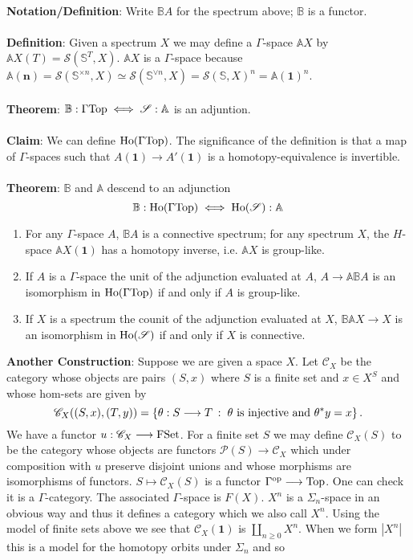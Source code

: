 \documentclass[11pt]{article}
\begin{document}
\begin{Jandr GammaCat notes}
\\
\textbf{Notation/Definition}: Write $\mathbb{B}A$ for the spectrum above; $\mathbb{B}$ is a functor.\\
\\
\textbf{Definition}: Given a spectrum $X$ we may define a $\Gamma$-space $\mathbb{A}X$ by $\mathbb{A}X(T)=\mathscr{S}(\mathbb{S}^T,X)$. $\mathbb{A}X$ is a $\Gamma$-space because $\mathbb{A}(\textbf{n})=\mathscr{S}(\mathbb{S}^{\times n},X)\simeq\mathscr{S}(\mathbb{S}^{\vee n},X)=\mathscr{S}(\mathbb{S},X)^n=\mathbb{A}(\textbf{1})^n$.\\
\\
\textbf{Theorem}: $\mathbb{B}:\Gamma\textup{Top}\iff\mathscr{S}:\mathbb{A}$ is an adjuntion.\\
\\
\textbf{Claim}: We can define $\textup{Ho}(\Gamma\textup{Top})$. The significance of the definition is that a map of $\Gamma$-spaces such that $A(\textbf{1})\to A'(\textbf{1})$ is a homotopy-equivalence is invertible.
\\
\\
\textbf{Theorem}: $\mathbb{B}$ and $\mathbb{A}$ descend to an adjunction
\[\mathbb{B}:\textup{Ho}(\Gamma\textup{Top})\iff\textup{Ho}(\mathscr{S}):\mathbb{A}\]
\begin{enumerate}
\item For any $\Gamma$-space $A$, $\mathbb{B}A$ is a connective spectrum; for any spectrum $X$, the $H$-space $\mathbb{A}X(\textbf{1})$ has a homotopy inverse, i.e. $\mathbb{A}X$ is group-like.
\item If $A$ is a $\Gamma$-space the unit of the adjunction evaluated at $A$, $A\to\mathbb{A}\mathbb{B}A$ is an isomorphism in $\textup{Ho}(\Gamma\textup{Top})$ if and only if $A$ is group-like.
\item If $X$ is a spectrum the counit of the adjunction evaluated at $X$, $\mathbb{B}\mathbb{A}X\to X$ is an isomorphism in $\textup{Ho}(\mathscr{S})$ if and only if $X$ is connective.
\end{enumerate}
\phantom{poo}
\textbf{Another Construction}: Suppose we are given a space $X$. Let $\mathscr{C}_X$ be the category whose objects are pairs $(S,x)$ where $S$ is a finite set and $x\in X^S$ and whose hom-sets are given by
\[\mathscr{C}_X((S,x),(T,y))=\left\{\theta:S\to T
\hspace{2pt} : \hspace{3pt}
\theta\textup{ is injective and }
\theta^*y=x\right\}.\]
We have a functor $u:\mathscr{C}_X\to\textup{FSet}$. For a finite set $S$ we may define $\mathscr{C}_X(S)$ to be the category whose objects are functors $\mathscr{P}(S)\to\mathscr{C}_X$ which under composition with $u$ preserve disjoint unions and whose morphisms are isomorphisms of functors. $S\mapsto\mathscr{C}_X(S)$ is a functor $\Gamma^{\textup{op}}\to\textup{Top}$. One can check it is a $\Gamma$-category. The associated $\Gamma$-space is $F(X)$. $X^n$ is a $\Sigma_n$-space in an obvious way and thus it defines a category which we also call $X^n$. Using the model of finite sets above we see that $\mathscr{C}_X(\textbf{1})$ is $\coprod_{n\geq 0} X^n$. When we form $|X^n|$ this is a model for the homotopy orbits under $\Sigma_n$ and so

\end{Jandr GammaCat notes}
\end{document}
